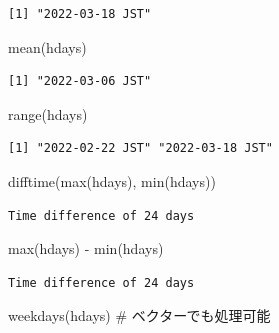 \documentclass[
  letterpaper,
  DIV=11,
  numbers=noendperiod]{scrreprt}
\newenvironment{Shaded}{\begin{snugshade}}{\end{snugshade}}
\newcommand{\CommentTok}[1]{\textcolor[rgb]{0.37,0.37,0.37}{#1}}
\newcommand{\FunctionTok}[1]{\textcolor[rgb]{0.28,0.35,0.67}{#1}}
\newcommand{\NormalTok}[1]{\textcolor[rgb]{0.00,0.23,0.31}{#1}}
\newcommand{\SpecialCharTok}[1]{\textcolor[rgb]{0.37,0.37,0.37}{#1}}
\begin{document}
\begin{verbatim}
[1] "2022-03-18 JST"
\end{verbatim}

\begin{Shaded}
\begin{Highlighting}[]
\FunctionTok{mean}\NormalTok{(hdays)}
\end{Highlighting}
\end{Shaded}

\begin{verbatim}
[1] "2022-03-06 JST"
\end{verbatim}

\begin{Shaded}
\begin{Highlighting}[]
\FunctionTok{range}\NormalTok{(hdays)}
\end{Highlighting}
\end{Shaded}

\begin{verbatim}
[1] "2022-02-22 JST" "2022-03-18 JST"
\end{verbatim}

\begin{Shaded}
\begin{Highlighting}[]
\FunctionTok{difftime}\NormalTok{(}\FunctionTok{max}\NormalTok{(hdays), }\FunctionTok{min}\NormalTok{(hdays))}
\end{Highlighting}
\end{Shaded}

\begin{verbatim}
Time difference of 24 days
\end{verbatim}

\begin{Shaded}
\begin{Highlighting}[]
\FunctionTok{max}\NormalTok{(hdays) }\SpecialCharTok{{-}} \FunctionTok{min}\NormalTok{(hdays)}
\end{Highlighting}
\end{Shaded}

\begin{verbatim}
Time difference of 24 days
\end{verbatim}

\begin{Shaded}
\begin{Highlighting}[]
\FunctionTok{weekdays}\NormalTok{(hdays) }\CommentTok{\# ベクターでも処理可能}
\end{Highlighting}
\end{Shaded}
\end{document}
